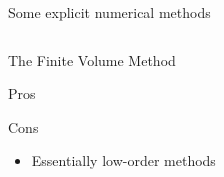 \begin{withoutheadline}
\begin{frame}{Some explicit numerical methods}
\begin{overprint}
\begin{columns}
\begin{column}{0.49\textwidth}
\begin{block}{The Finite Volume Method \cite{Leveque}}
\begin{footnotesize}
\begin{block}{\footnotesize Pros}
\begin{itemize}
                \end{itemize}
              \end{block}
              \vspace{-0.2cm}
              \begin{block}{\footnotesize Cons}
                \vspace{-0.2cm}
                \begin{itemize}
                \item[] Essentially low-order methods
                \end{itemize}
              \end{block}
            \end{footnotesize}
          \end{block}
        \end{column}
      \end{columns}
      \vspace{-0.3cm} 
      

\end{overprint}
\end{frame}
\end{withoutheadline}
